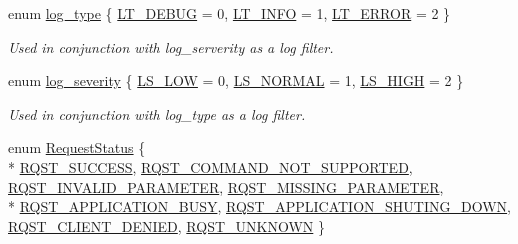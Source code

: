 \begin{DoxyCompactItemize}
\item 
enum \hyperlink{a00089_a18db16d1f4c281bec16e637c56b0cc88}{log\-\_\-type} \{ \hyperlink{a00089_a18db16d1f4c281bec16e637c56b0cc88a5534dcd03ff720ecbe64b0c91ea3b228}{L\-T\-\_\-\-D\-E\-B\-U\-G} = 0, 
\hyperlink{a00089_a18db16d1f4c281bec16e637c56b0cc88ad1c780d761d1eec16905dd8e306764aa}{L\-T\-\_\-\-I\-N\-F\-O} = 1, 
\hyperlink{a00089_a18db16d1f4c281bec16e637c56b0cc88ad444adf89c01661a3f2cacd8baea3d90}{L\-T\-\_\-\-E\-R\-R\-O\-R} = 2
 \}
\begin{DoxyCompactList}\small\item\em Used in conjunction with log\-\_\-serverity as a log filter. \end{DoxyCompactList}\item 
enum \hyperlink{a00089_a2479a56cdedf21357ca5c68adc699d00}{log\-\_\-severity} \{ \hyperlink{a00089_a2479a56cdedf21357ca5c68adc699d00af0d1f4c43feb2c79cbd2c44cba171b9f}{L\-S\-\_\-\-L\-O\-W} = 0, 
\hyperlink{a00089_a2479a56cdedf21357ca5c68adc699d00aac284c5fe534f527e04da9327a0e484e}{L\-S\-\_\-\-N\-O\-R\-M\-A\-L} = 1, 
\hyperlink{a00089_a2479a56cdedf21357ca5c68adc699d00a98a2f9d2011b440e4a890b9c0dbb7bc2}{L\-S\-\_\-\-H\-I\-G\-H} = 2
 \}
\begin{DoxyCompactList}\small\item\em Used in conjunction with log\-\_\-type as a log filter. \end{DoxyCompactList}\item 
enum \hyperlink{a00089_af5792fb0f68695c1a1e7a4c720d9262e}{Request\-Status} \{ \\*
\hyperlink{a00089_af5792fb0f68695c1a1e7a4c720d9262ea48f403b25d056ead863e1bb74664b388}{R\-Q\-S\-T\-\_\-\-S\-U\-C\-C\-E\-S\-S}, 
\hyperlink{a00089_af5792fb0f68695c1a1e7a4c720d9262ead080a858803c520f16f1d575431e19ec}{R\-Q\-S\-T\-\_\-\-C\-O\-M\-M\-A\-N\-D\-\_\-\-N\-O\-T\-\_\-\-S\-U\-P\-P\-O\-R\-T\-E\-D}, 
\hyperlink{a00089_af5792fb0f68695c1a1e7a4c720d9262ea94213a4c1e365e07fad5537b158ccd8c}{R\-Q\-S\-T\-\_\-\-I\-N\-V\-A\-L\-I\-D\-\_\-\-P\-A\-R\-A\-M\-E\-T\-E\-R}, 
\hyperlink{a00089_af5792fb0f68695c1a1e7a4c720d9262ea3ad7cafe8fc0329ea5edde0ebf5c807e}{R\-Q\-S\-T\-\_\-\-M\-I\-S\-S\-I\-N\-G\-\_\-\-P\-A\-R\-A\-M\-E\-T\-E\-R}, 
\\*
\hyperlink{a00089_af5792fb0f68695c1a1e7a4c720d9262eaa411a8dcb60e0303c992c74dd4df4f43}{R\-Q\-S\-T\-\_\-\-A\-P\-P\-L\-I\-C\-A\-T\-I\-O\-N\-\_\-\-B\-U\-S\-Y}, 
\hyperlink{a00089_af5792fb0f68695c1a1e7a4c720d9262ea1e1bd5f607c7cc861e2f7173253115b4}{R\-Q\-S\-T\-\_\-\-A\-P\-P\-L\-I\-C\-A\-T\-I\-O\-N\-\_\-\-S\-H\-U\-T\-I\-N\-G\-\_\-\-D\-O\-W\-N}, 
\hyperlink{a00089_af5792fb0f68695c1a1e7a4c720d9262eab5769a29096e43de01864a3322d45a03}{R\-Q\-S\-T\-\_\-\-C\-L\-I\-E\-N\-T\-\_\-\-D\-E\-N\-I\-E\-D}, 
\hyperlink{a00089_af5792fb0f68695c1a1e7a4c720d9262ea8b54c6e47b50ce90a375d79b957f5ddb}{R\-Q\-S\-T\-\_\-\-U\-N\-K\-N\-O\-W\-N}
 \}
\end{DoxyCompactItemize}
